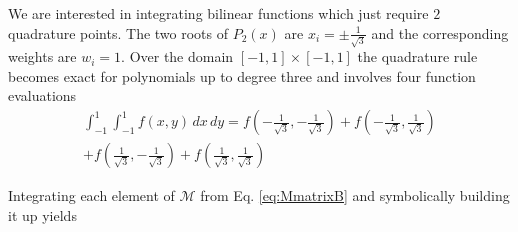 \documentclass[11pt]{article}
\begin{document}
We are interested in integrating bilinear functions which just require $2$ quadrature points. The two roots of $P_2(x)$ are $x_i = \pm \frac{1}{\sqrt{3}}$ and the corresponding weights are $w_i = 1$. Over the domain $[-1,1]\times[-1,1]$ the quadrature rule becomes exact for polynomials up to degree three and involves four function evaluations
\begin{multline}
	\int_{-1}^1 \int_{-1}^1 f(x,y) \, dx \, dy = f\left(-\frac{1}{\sqrt{3}}, -\frac{1}{\sqrt{3}}\right) + f\left(-\frac{1}{\sqrt{3}}, \frac{1}{\sqrt{3}}\right) \\
	+ f\left(\frac{1}{\sqrt{3}}, -\frac{1}{\sqrt{3}}\right) + f\left(\frac{1}{\sqrt{3}}, \frac{1}{\sqrt{3}}\right)
\end{multline}

Integrating each element of $\mathcal{M}$ from Eq. \eqref{eq:MmatrixB} and symbolically building it up yields
\end{document}
